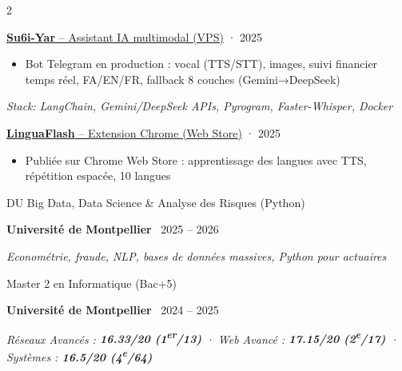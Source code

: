 \documentclass[7pt,a4paper,withhyper]{altacv}
\renewcommand{\cvevent}[4]{%
  {\large\color{emphasis}\raggedright #1\par}
  \smallskip\normalsize
  \ifstrequal{#2}{}{}{%
    \textbf{\color{accent}#2}%
  }%
  \ifstrequal{#4}{}{}{%
    \ifstrequal{#2}{}{}{\hspace{1.5em}}%
    {\small\cvLocationMarker~#4}%
  }%
  \ifstrequal{#3}{}{}{%
    \hfill{\small\cvDateMarker~#3}%
  }\par
}
\providecommand{\cvgithub}{github-username}
\begin{document}
\begin{paracol}{2}
{\large\color{emphasis}\raggedright\href{https://github.com/\cvgithub/su6i-yar}{\textbf{Su6i-Yar} -- Assistant IA multimodal (VPS)} {\small\color{LightGrey}· 2025}\par}
\vspace{0.1em}
\begin{itemize}[leftmargin=1.25em, nosep]
\item \justifying Bot Telegram en production : vocal (TTS/STT), images, suivi financier temps réel, FA/EN/FR, fallback 8 couches (Gemini→DeepSeek)
\end{itemize}
\noindent\textit{\small Stack: LangChain, Gemini/DeepSeek APIs, Pyrogram, Faster-Whisper, Docker}\par
\vspace{0.1em}\par\vspace{0.1em}

{\large\color{emphasis}\raggedright\href{https://github.com/\cvgithub/LinguaFlash}{\textbf{LinguaFlash} -- Extension Chrome (Web Store)} {\small\color{LightGrey}· 2025}\par}
\vspace{0.1em}
\begin{itemize}[leftmargin=1.25em, nosep]
\item \justifying Publiée sur Chrome Web Store : apprentissage des langues avec TTS, répétition espacée, 10 langues
\end{itemize}\par

\vspace{-0.5ex}

\cvevent{DU Big Data, Data Science \& Analyse des Risques (Python)}{Université de Montpellier}{2025 – 2026}{}
\textit{Econométrie, fraude, NLP, bases de données massives, Python pour actuaires}\par

\vspace{0.1em}\par\vspace{0.1em}

\cvevent{Master 2 en Informatique (Bac+5)}{Université de Montpellier}{2024 – 2025}{}
\textit{Réseaux Avancés : \textbf{16.33/20 (1\textsuperscript{er}/13)} · Web Avancé : \textbf{17.15/20 (2\textsuperscript{e}/17)} · Systèmes : \textbf{16.5/20 (4\textsuperscript{e}/64)}}\par

\end{paracol}
\end{document}
